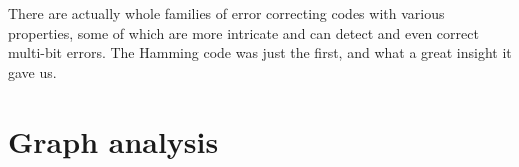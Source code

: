 There are actually whole families of error correcting codes with various
properties, some of which are more intricate and can detect and even correct
multi-bit errors. The Hamming code was just the first, and what a great insight
it gave us.



\pagebreak

\section{Graph analysis}

